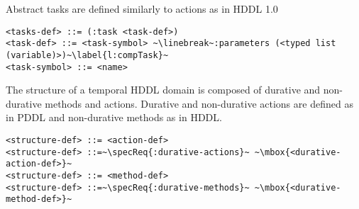 \documentclass[letterpaper]{article} %
\begin{document}
%
%
%
\noindent Abstract tasks are defined similarly to actions as in HDDL 1.0
\begin{lstlisting}[firstnumber=last, escapechar=~]
<tasks-def> ::= (:task <task-def>)
<task-def> ::= <task-symbol> ~\linebreak~:parameters (<typed list (variable)>)~\label{l:compTask}~
<task-symbol> ::= <name>
\end{lstlisting}

\noindent The structure of a temporal HDDL domain is composed of durative and non-durative methods and actions. Durative and non-durative actions are defined as in PDDL and non-durative methods as in HDDL.

\begin{lstlisting}[firstnumber=last, escapechar=~]
<structure-def> ::= <action-def>
<structure-def> ::=~\specReq{:durative-actions}~ ~\mbox{<durative-action-def>}~
<structure-def> ::= <method-def>
<structure-def> ::=~\specReq{:durative-methods}~ ~\mbox{<durative-method-def>}~
\end{lstlisting}
\end{document}
